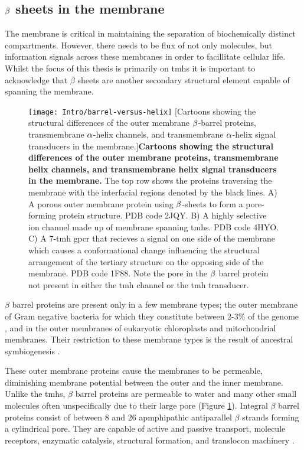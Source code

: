 \subsection{$\protect\beta$ sheets in the membrane}

The membrane is critical in maintaining the separation of biochemically distinct compartments.
However, there needs to be flux of not only molecules, but information signals across these membranes in order to facillitate cellular life.
Whilst the focus of this thesis is primarily on \gls{tmh}s it is important to acknowledge that $\beta$ sheets are another secondary structural element capable of spanning the membrane.

\begin{figure}[ht]
\centering
\texttt{[image: Intro/barrel-versus-helix]}
		[Cartoons showing the structural differences of the outer membrane $\protect\beta$\--barrel proteins, transmembrane $\protect\alpha$\--helix channels, and transmembrane $\protect\alpha$\--helix signal transducers in the membrane.]{\textbf{Cartoons showing the structural differences of the outer membrane proteins, transmembrane helix channels, and transmembrane helix signal transducers in the membrane.}
		The top row shows the proteins traversing the membrane with the interfacial regions denoted by the black lines.
		A) A porous outer membrane protein using $\protect\beta$\--sheets to form a pore\--forming protein structure.
		PDB code 2JQY.
		B) A highly selective ion channel made up of membrane spanning \gls{tmh}s.
		PDB code 4HYO.
		C) A 7\--\gls{tmh} \gls{gpcr} that recieves a signal on one side of the membrane which causes a conformational change influencing the structural arrangement of the tertiary structure on the opposing side of the membrane.
		PDB code 1F88.
		Note the pore in the $\protect\beta$ barrel protein not present in either the \gls{tmh} channel or the \gls{tmh} transducer.
		}
\label{fig:barrel-versus-helix}
\end{figure}

$\beta$ barrel proteins are present only in a few membrane types; the outer membrane of Gram negative bacteria for which they constitute between 2-3\% of the genome \cite{Wimley2003}, and in the outer membranes of eukaryotic chloroplasts and mitochondrial membranes.
Their restriction to these membrane types is the result of ancestral symbiogenesis \cite{McFadden2001, Gray1999, Fischer1994, Zeth2010, Fairman2011, Ulrich2015}.

These outer membrane proteins cause the membranes to be permeable, diminishing membrane potential between the outer and the inner membrane.
Unlike the \gls{tmh}s, $\beta$ barrel proteins are permeable to water and many other small molecules often unspecifically due to their large pore (Figure \ref{fig:barrel-versus-helix}).
Integral $\beta$ barrel proteins consist of between 8 and 26 apmphipathic antiparallel $\beta$ strands forming a cylindrical pore.
They are capable of active and passive transport, molecule receptors, enzymatic catalysis, structural formation, and translocon machinery \cite{Wimley2003}.


